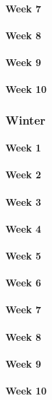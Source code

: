 \documentclass[draftclsnofoot, onecolumn, compsoc, 10pt]{IEEEtran}
\begin{document}
\paragraph{Week 7}
\paragraph{Week 8}
\paragraph{Week 9}
\paragraph{Week 10}
\subsubsection{Winter}
\paragraph{Week 1}
\paragraph{Week 2}
\paragraph{Week 3}
\paragraph{Week 4}
\paragraph{Week 5}
\paragraph{Week 6}
\paragraph{Week 7}
\paragraph{Week 8}
\paragraph{Week 9}
\paragraph{Week 10}
\end{document}
